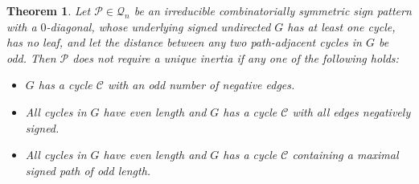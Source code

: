 \documentclass[a4paper, 10pt]{article}
\newtheorem{theorem}{Theorem}[section]
\numberwithin{equation}{section}
\begin{document}
\begin{theorem}\label{xxth3.22}
	Let $\mathcal{P}\in \mathcal{Q}_n$ be an irreducible combinatorially symmetric sign pattern with a $0$-diagonal, whose underlying signed undirected $G$ has at least one cycle, has no leaf, and let the distance between any two path-adjacent cycles in $G$ be odd. Then $\mathcal{P}$ does not require a unique inertia if any one of the following holds:
	\begin{itemize}
		\item[i.] $G$ has a cycle $\mathcal{C}$ with an odd number of negative edges.
		\item[ii.] All cycles in $G$ have even length and $G$ has a cycle $\mathcal{C}$ with all edges negatively signed.
		\item[iii.] All cycles in $G$ have even length and $G$ has a cycle $\mathcal{C}$ containing a maximal signed path of odd length.
	\end{itemize}
\end{theorem}
\end{document}
